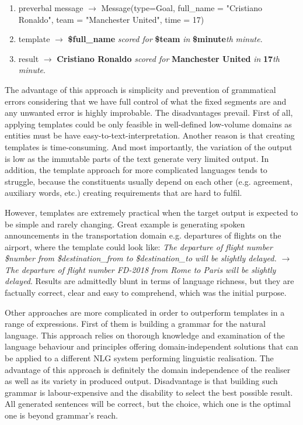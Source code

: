 \begin{enumerate}
	\item preverbal message $\rightarrow$ Message(type=Goal, full\_name = "Cristiano Ronaldo", team = "Manchester United", time = 17) \label{lr-t-1}
	\item template $\rightarrow$ \textbf{\$full\_name} \emph{scored for} \textbf{\$team} \emph{in} \textbf{\$minute}\emph{th} \emph{minute}. \label{lr-t-2}
	\item result $\rightarrow$ \textbf{Cristiano Ronaldo} \emph{scored for} \textbf{Manchester United} \emph{in} \textbf{17}\emph{th} \emph{minute}. \label{lr-t-3}
\end{enumerate}

The advantage of this approach is simplicity and prevention of grammatical errors considering that we have full control of what the fixed segments are and any unwanted error is highly improbable. The disadvantages prevail. First of all, applying templates could be only feasible in well-defined low-volume domains as entities must be have easy-to-text-interpretation. Another reason is that creating templates is time-consuming. And most importantly, the variation of the output is low as the immutable parts of the text generate very limited output. In addition, the template approach for more complicated languages tends to struggle, because the constituents usually depend on each other (e.g. agreement, auxiliary words, etc.) creating requirements that are hard to fulfil. 

However, templates are extremely practical when the target output is expected to be simple and 
rarely changing. Great example is generating spoken announcements in the transportation domain e.g. departures of flights on the airport, where the template could look like: \emph{The departure of flight number \$number from \$destination\_from to \$destination\_to will be slightly delayed. $\rightarrow$ The departure of flight number FD-2018 from Rome to Paris will be slightly delayed}. Results are admittedly blunt in terms of language richness, but they are factually correct, clear and easy to comprehend, which was the initial purpose.
     
Other approaches are more complicated in order to outperform templates in a range of expressions.  First of them is building a grammar for the natural language. This approach relies on thorough knowledge and examination of the language behaviour and principles offering domain-independent solutions that can be applied to a different NLG system performing linguistic realisation. The advantage of this approach is definitely the domain independence of the realiser as well as its variety in produced output. Disadvantage is that building such grammar is labour-expensive and the disability to select the best possible result. All generated sentences will be correct, but the choice, which one is the optimal one is beyond grammar's reach.

